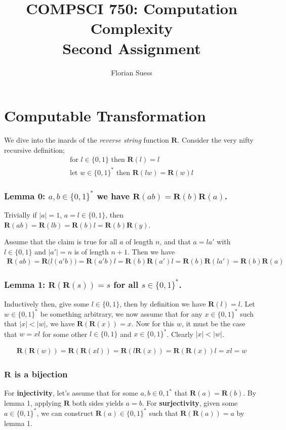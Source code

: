 \documentclass{article}
\title{COMPSCI 750: Computation Complexity \\ Second Assignment}
\author{Florian Suess}
\begin{document}
\maketitle

\section*{Computable Transformation}
We dive into the inards of the \emph{reverse string} function $\bm{R}$. Consider the very nifty recursive definition;
\begin{align*}
	\text{for } l \in \{0,1\} \text{ then } \bm{R}(l) = l \\
	\text{let } w \in \{0,1\}^* \text{ then } \bm{R}(lw) = \bm{R}(w)l
\end{align*}

\subsubsection*{Lemma 0: $a,b \in \{0,1\}^*$ we have $\bm{R}(ab) = \bm{R}(b)\bm{R}(a)$.}
Trivially if $|a|=1$, $a=l\in \{0,1\}$, then $\bm{R}(ab)=\bm{R}(lb)=\bm{R}(b)l=\bm{R}(b)\bm{R}(y)$.

Assume that the claim is true for all $a$ of length $n$, and that $a=la'$ with $l\in \{0,1\}$ and $|a'|=n$ is of length $n+1$. Then we have
\begin{align*}
	\bm{R}(ab)=\bm{R}\bigl(l(a'b)\bigr)=\bm{R}(a'b)l=\bm{R}(b)\bm{R}(a')l=\bm{R}(b)\bm{R}(la')=\bm{R}(b)\bm{R}(a)
\end{align*}

\subsubsection*{Lemma 1: $\bm{R}(\bm{R}(s)) = s$ for all $s \in \{0,1\}^*$.}
Inductively then, give some $l \in \{0,1\}$, then by definition we have $\bm{R}(l) = l$. Let $w \in \{0,1\}^*$ be something arbitrary, we now assume that for any $x \in \{0,1\}^*$ such that $|x| < |w|$, we have $\bm{R}(\bm{R}(x)) = x$. Now for this $w$, it must be the case that $w = xl$ for some other $l \in \{0,1\}$ and $x \in \{0,1\}^*$. Clearly $|x| < |w|$.

\begin{align*}
	\bm{R}(\bm{R}(w)) = \bm{R}(\bm{R}(xl)) = \bm{R}(l\bm{R}(x)) = \bm{R}(\bm{R}(x))l = xl = w
\end{align*}

\subsubsection*{$\bm{R}$ is a bijection}
For \textbf{injectivity}, let's assume that for some $a,b \in {0,1}^*$ that $\bm{R}(a) = \bm{R}(b)$. By lemma 1, applying $\bm{R}$ both sides yields $a = b$. For \textbf{surjectivity}, given some $a \in \{0,1\}^*$, we can construct $\bm{R}(a) \in \{0,1\}^*$ such that $\bm{R}(\bm{R}(a)) = a$ by lemma 1.
\end{document}
